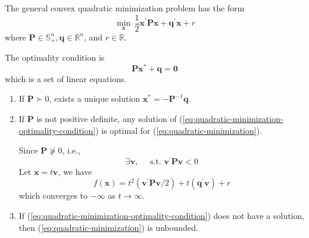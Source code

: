 \begin{remark}
\end{remark}

\begin{example}
    The general convex quadratic minimization problem has the form
    \begin{equation}
        \min_{\mathbf{x}}\,\frac{1}{2}\mathbf{x}^{\prime}\mathbf{P}\mathbf{x}+\mathbf{q}^{\prime}\mathbf{x}+r \label{eq:quadratic-minimization}
    \end{equation}
    where $\mathbf{P}\in\mathbb{S}_{+}^{n},\mathbf{q}\in\mathbb{R}^{n}$, and $r\in\mathbb{R}$.

    The optimality condition is
    \begin{equation}
        \mathbf{P}\mathbf{x}^{*}+\mathbf{q}=\mathbf{0}
        \label{eq:quadratic-minimization-optimality-condition}
    \end{equation}
    which is a set of linear equations.
    \begin{enumerate}
        \item If $\mathbf{P}\succ 0$, exists a unique solution $\mathbf{x}^{*}=-\mathbf{P}^{-1}\mathbf{q}$.

        \item If $\mathbf{P}$ is not positive definite, any solution of (\ref{eq:quadratic-minimization-optimality-condition}) is optimal for (\ref{eq:quadratic-minimization}).

              Since $\mathbf{P}\nsucceq 0$, i.e.,
              \begin{equation*}
                  \exists\mathbf{v},\quad\text{ s.t. }\mathbf{v}^{\prime}\mathbf{P}\mathbf{v}<0
              \end{equation*}
              Let $\mathbf{x}=t\mathbf{v}$, we have
              \begin{equation*}
                  f\left(\mathbf{x}\right)=t^{2}\left(\mathbf{v}^{\prime}\mathbf{P}\mathbf{v}/2\right)+t\left(\mathbf{q}^{\prime}\mathbf{v}\right)+r
              \end{equation*}
              which converges to $-\infty$ as $t\rightarrow\infty$.

        \item If (\ref{eq:quadratic-minimization-optimality-condition}) does not have a solution, then (\ref{eq:quadratic-minimization}) is unbounded.


\end{enumerate}
\end{example}

